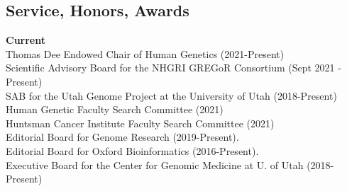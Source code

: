 \documentclass[margin,line]{cv}
\begin{document}
\begin{resume}
    \section{\mysidestyle Service, Honors, Awards}
    \textbf{Current}\\
    Thomas Dee Endowed Chair of Human Genetics (2021-Present)  \\\vspace{1mm}%
    Scientific Advisory Board for the NHGRI GREGoR Consortium (Sept 2021 - Present) \\\vspace{1mm}%
    SAB for the Utah Genome Project at the University of Utah (2018-Present) \\\vspace{1mm}%
    Human Genetic Faculty Search Committee (2021) \\\vspace{1mm}%
    Huntsman Cancer Institute Faculty Search Committee (2021) \\\vspace{1mm}%
    Editorial Board for Genome Research (2019-Present). \\\vspace{1mm}%
    Editorial Board for Oxford Bioinformatics (2016-Present). \\\vspace{1mm}%
    Executive Board for the Center for Genomic Medicine at U. of Utah (2018-Present) \\\vspace{1mm}%


\end{resume}
\end{document}
